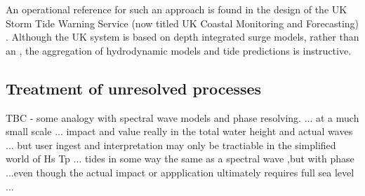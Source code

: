 An operational reference for such an approach is found in the design of the UK Storm Tide Warning Service (now titled UK Coastal Monitoring and Forecasting) \cite{Horsburg:2009ui}.   Although the UK system is based on depth integrated surge models, rather than an \OGCM{}, the aggregation of hydrodynamic models and tide predictions is instructive. 






 


\subsection{Treatment of unresolved processes}


TBC - some analogy with spectral wave models and phase resolving.
... at a much small scale
... impact and value really in the total water height and actual waves
... but user ingest and interpretation may only be tractiable in the simplified world of Hs Tp
... tides in some way the same as a spectral wave ,but with phase  ...even though the actual impact or appplication ultimately requires full sea level ...



